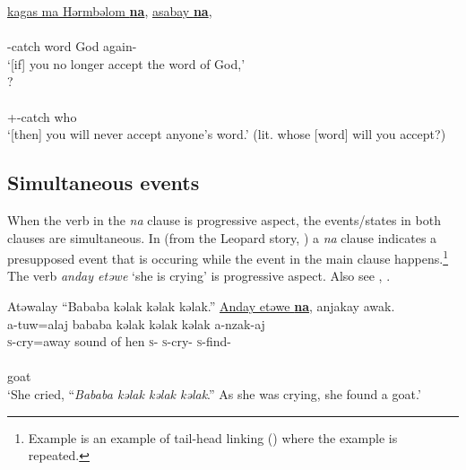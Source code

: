       \medskip
\underline{kagas  ma  Hərmbəlom  \textbf{na}},  \underline{asabay  \textbf{na}},\\      
\gll {}          \\ 
     {\twoS}-catch   word     God {\PSP}  again-{\NEG}  {\PSP} \\
\glt ‘[if] you no longer accept the word of God,’\\ 

      ?  \\      
 \\ 
     {\twoS}+{\POT}-catch  {\PSP}   {\POSS}  who  \\
\glt  ‘[then] you will never accept anyone's word.' (lit. whose [word] will you accept?)\\
\z

\subsection{Simultaneous events}\label{sec:11.1.2}
\hypertarget{RefHeading1213201525720847}{}
When the verb in the \textit{na} clause is progressive aspect, the events/states in both clauses are simultaneous. In  (from the Leopard story, \citealt{Friesen2003}) a \textit{na} clause indicates a presupposed event that is occuring while the event in the main clause happens.\footnote{Example  is an example of tail-head linking () where the example is repeated.} The verb \textit{anday etəwe}  ‘she is crying’ is progressive aspect. Also see , . 

\ea \label{ex:11:20}
Atəwalay  “Bababa  kəlak  kəlak  kəlak.”  \underline{Anday  etəwe  \textbf{na}},  anjakay  awak.\\
\gll  a-tuw=alaj  {bababa  kəlak kəlak kəlak}      {a-nzak-aj}\\ 
      \textsc{s}-cry=away    {sound of hen}      \textsc{s}-{\PRG}  \textsc{s}-cry-{\CL}  {\PSP}  \textsc{s}-find{}-{\CL}\\  
     
      \medskip
{}\\      
     goat\\
\glt  ‘She cried, “\textit{Bababa kəlak kəlak kəlak}.” As she was crying, she found a goat.’ 
\z
{}
